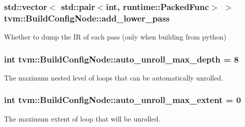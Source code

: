 \subsubsection[{\texorpdfstring{add\+\_\+lower\+\_\+pass}{add_lower_pass}}]{\setlength{\rightskip}{0pt plus 5cm}std\+::vector$<$ std\+::pair$<$int, {\bf runtime\+::\+Packed\+Func}$>$ $>$ tvm\+::\+Build\+Config\+Node\+::add\+\_\+lower\+\_\+pass}\hypertarget{classtvm_1_1BuildConfigNode_a766fcbcd64c2f2183c423e42f1bffb7f}{}\label{classtvm_1_1BuildConfigNode_a766fcbcd64c2f2183c423e42f1bffb7f}


Whether to dump the IR of each pass (only when building from python) 

\subsubsection[{\texorpdfstring{auto\+\_\+unroll\+\_\+max\+\_\+depth}{auto_unroll_max_depth}}]{\setlength{\rightskip}{0pt plus 5cm}int tvm\+::\+Build\+Config\+Node\+::auto\+\_\+unroll\+\_\+max\+\_\+depth = 8}\hypertarget{classtvm_1_1BuildConfigNode_ae1e3ea8be3710e8e91dcb691ea75c460}{}\label{classtvm_1_1BuildConfigNode_ae1e3ea8be3710e8e91dcb691ea75c460}


The maximum nested level of loops that can be automatically unrolled. 

\subsubsection[{\texorpdfstring{auto\+\_\+unroll\+\_\+max\+\_\+extent}{auto_unroll_max_extent}}]{\setlength{\rightskip}{0pt plus 5cm}int tvm\+::\+Build\+Config\+Node\+::auto\+\_\+unroll\+\_\+max\+\_\+extent = 0}\hypertarget{classtvm_1_1BuildConfigNode_ac2bd9a11784fb5908cff6760e80a2534}{}\label{classtvm_1_1BuildConfigNode_ac2bd9a11784fb5908cff6760e80a2534}


The maximum extent of loop that will be unrolled. 


